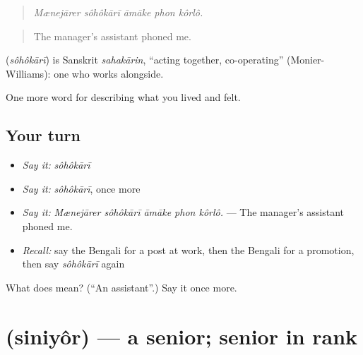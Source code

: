 \begin{quote}
    
\end{quote}

\begin{quote}
\emph{Mænejārer sôhôkārī āmāke phon kôrlô.}
\end{quote}

\begin{quote}
The manager's assistant phoned me.
\end{quote}

\begin{cousinweb}
\textbf{} (\emph{sôhôkārī}) is Sanskrit \emph{sahakārin}, \textquotedblleft{}acting together, co-operating\textquotedblright{} (Monier-Williams): one who works alongside.
\end{cousinweb}

\begin{grammarlens}[title={What you've built}]
One more word for describing what you lived and felt.
\end{grammarlens}

\subsection*{Your turn}
\begin{itemize}
\raggedright
  \item \emph{Say it:} \emph{sôhôkārī}
  \item \emph{Say it:} \emph{sôhôkārī}, once more
  \item \emph{Say it:} \emph{Mænejārer sôhôkārī āmāke phon kôrlô.} — The manager's assistant phoned me.
  \item \emph{Recall:} say the Bengali for a post at work, then the Bengali for a promotion, then say \emph{sôhôkārī} again
\end{itemize}

\begin{tcolorbox}[breakable,colback=teal!4,colframe=teal!35!black,title={Before you move on}]
What does  mean? (\textquotedblleft{}An assistant\textquotedblright{}.) Say it once more.
\end{tcolorbox}
\section[\texorpdfstring{\bn{সিনিয়র} (siniyôr)}{সিনিয়র (siniyôr)}]{ (siniyôr) — a senior; senior in rank}

\label{lesson:BN-C496-siniyor}



